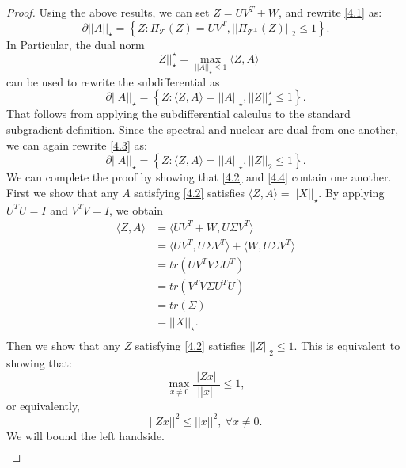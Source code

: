 \documentclass[11pt]{article}
\begin{document}
\begin{proof}
\noindent Using the above results, we can set $Z = UV^{T}+W$, and rewrite \eqref{4.1} as:
\begin{equation}
    \label{4.2}\tag{4.2}
    \partial||A||_\star = \left\{Z : \Pi_{\mathcal{T}}(Z)=UV^{T}, ||\Pi_{\mathcal{T}^\perp}(Z)||_2\leq 1\right\}.
\end{equation}
In Particular, the dual norm
\[
||Z||_\star^{\star} = \max\limits_{||A||_\star\leq 1} \langle Z,A \rangle
\]
can be used to rewrite the subdifferential as 
\begin{equation}
    \label{4.3}\tag{4.3}
    \partial||A||_\star = \left\{Z : \langle Z,A \rangle = ||A||_\star, ||Z||_\star^{\star}\leq 1\right\}.
\end{equation}
That follows from applying the subdifferential calculus to the standard subgradient definition. Since the spectral and nuclear are dual from one another, we can again rewrite \eqref{4.3} as:
\begin{equation}
    \label{4.4}\tag{4.4}
    \partial||A||_\star = \left\{Z : \langle Z,A \rangle = ||A||_\star, ||Z||_2\leq 1\right\}.
\end{equation}
We can complete the proof by showing that \eqref{4.2} and \eqref{4.4} contain one another. First we show that any $A$ satisfying \eqref{4.2} satisfies $\langle Z,A \rangle = ||X||_\star$. By applying $U^{T}U=I$ and $V^{T}V=I$, we obtain
\begin{equation*}
    \begin{aligned}
        \langle Z,A \rangle & = \langle UV^{T}+W, U\Sigma V^{T} \rangle \\
                            & = \langle UV^{T}, U\Sigma V^{T} \rangle + \langle W, U\Sigma V^{T} \rangle\\
                            & = tr(UV^{T}V\Sigma U^{T}) \\
                            & = tr(V^{T}V\Sigma U^{T}U) \\
                            & = tr(\Sigma) \\
                            & = ||X||_\star. \\
    \end{aligned}
\end{equation*}
Then we show that any $Z$ satisfying \eqref{4.2} satisfies $||Z||_2\leq 1$. This is equivalent to showing that:
\[
\max\limits_{x\neq 0}\frac{||Zx||}{||x||} \leq 1,
\]
or equivalently, 
\[
||Zx||^2 \leq ||x||^2, \ \forall x\neq 0.
\]
We will bound the left handside. 
\begin{equation*}
    \begin{aligned}

\end{aligned}
\end{equation*}
\end{proof}
\end{document}
